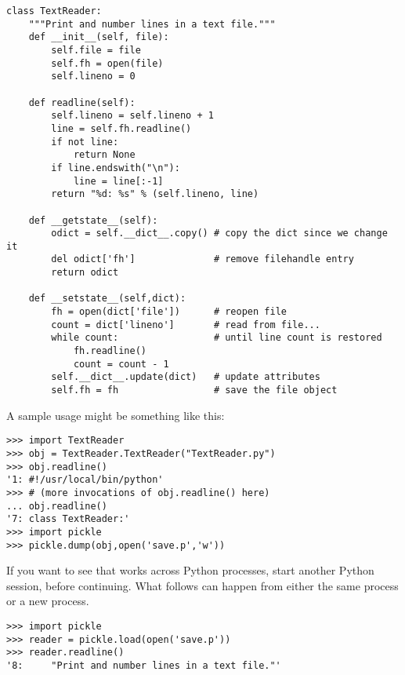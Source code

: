 \begin{verbatim}
class TextReader:
    """Print and number lines in a text file."""
    def __init__(self, file):
        self.file = file
        self.fh = open(file)
        self.lineno = 0

    def readline(self):
        self.lineno = self.lineno + 1
        line = self.fh.readline()
        if not line:
            return None
        if line.endswith("\n"):
            line = line[:-1]
        return "%d: %s" % (self.lineno, line)

    def __getstate__(self):
        odict = self.__dict__.copy() # copy the dict since we change it
        del odict['fh']              # remove filehandle entry
        return odict

    def __setstate__(self,dict):
        fh = open(dict['file'])      # reopen file
        count = dict['lineno']       # read from file...
        while count:                 # until line count is restored
            fh.readline()
            count = count - 1
        self.__dict__.update(dict)   # update attributes
        self.fh = fh                 # save the file object
\end{verbatim}

A sample usage might be something like this:

\begin{verbatim}
>>> import TextReader
>>> obj = TextReader.TextReader("TextReader.py")
>>> obj.readline()
'1: #!/usr/local/bin/python'
>>> # (more invocations of obj.readline() here)
... obj.readline()
'7: class TextReader:'
>>> import pickle
>>> pickle.dump(obj,open('save.p','w'))
\end{verbatim}

If you want to see that  works across Python
processes, start another Python session, before continuing.  What
follows can happen from either the same process or a new process.

\begin{verbatim}
>>> import pickle
>>> reader = pickle.load(open('save.p'))
>>> reader.readline()
'8:     "Print and number lines in a text file."'
\end{verbatim}


\begin{seealso}



\end{seealso}


